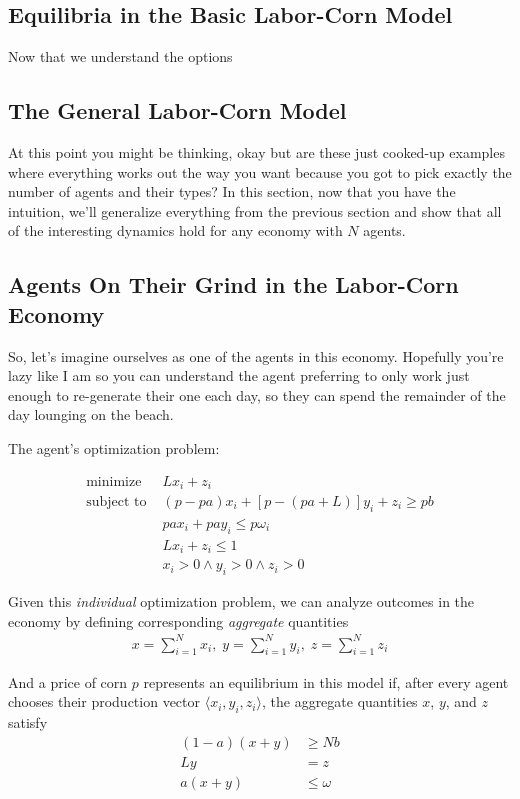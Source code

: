 \subsection{Equilibria in the Basic Labor-Corn Model}

Now that we understand the options

\subsection{The General Labor-Corn Model}

At this point you might be thinking, okay but are these just cooked-up examples where everything works out the way you want because you got to pick exactly the number of agents and their types? In this section, now that you have the intuition, we'll generalize everything from the previous section and show that all of the interesting dynamics hold for any economy with $N$ agents.

\subsection{Agents On Their Grind in the Labor-Corn Economy}

So, let's imagine ourselves as one of the agents in this economy. Hopefully you're lazy like I am so you can understand the agent preferring to only work just enough to re-generate their one \Corn{} each day, so they can spend the remainder of the day lounging on the beach.

The agent's optimization problem:

\begin{align}
\text{minimize } & Lx_i + z_i \\
\text{subject to } & (p-pa)x_i + [p - (pa + L)]y_i + z_i \geq pb \\
 & pax_i + pay_i \leq p\omega_i \\
 & Lx_i + z_i \leq 1 \\
 & x_i > 0 \wedge y_i > 0 \wedge z_i > 0
\end{align}

Given this \textit{individual} optimization problem, we can analyze outcomes in the economy by defining corresponding \textit{aggregate} quantities
\begin{align*}
x = \sum_{i=1}^N x_i, \; y = \sum_{i=1}^N y_i, \; z = \sum_{i=1}^N z_i
\end{align*}

And a price of corn $p$ represents an equilibrium in this model if, after every agent chooses their production vector $\langle x_i, y_i, z_i\rangle$, the aggregate quantities $x$, $y$, and $z$ satisfy
\begin{align}
(1-a)(x+y) &\geq Nb \\
Ly &= z \\
a(x + y) &\leq \omega
\end{align}

